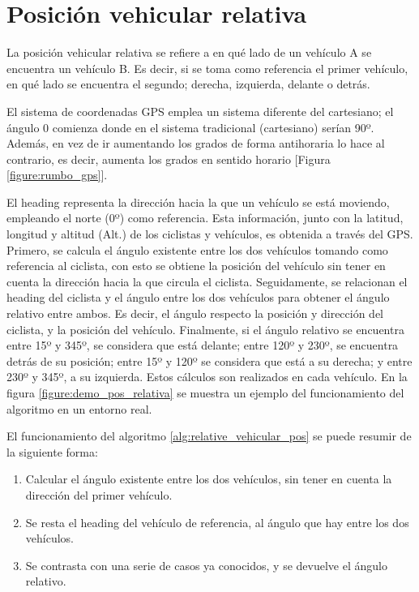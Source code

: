 \section{Posición vehicular relativa}\label{apendice:posicion_relative}
La posición vehicular relativa se refiere a en qué lado de un vehículo A se encuentra
un vehículo B. Es decir, si se toma como referencia el primer vehículo, en qué lado se
encuentra el segundo; derecha, izquierda, delante o detrás.

El sistema de coordenadas GPS emplea un sistema diferente del cartesiano; el ángulo 0
comienza donde en el sistema tradicional (cartesiano) serían 90º. Además, en vez de ir
aumentando los grados de forma antihoraria lo hace al contrario, es decir, aumenta los
grados en sentido horario [Figura \ref{figure:rumbo_gps}].

El heading representa la dirección hacia la que un vehículo se está moviendo, empleando
el norte (0º) como referencia. Esta información, junto con la latitud, longitud y
altitud (Alt.) de los ciclistas y vehículos, es obtenida a través del GPS. Primero, se
calcula el ángulo existente entre los dos vehículos tomando como referencia al ciclista,
con esto se obtiene la posición del vehículo sin tener en cuenta la dirección hacia la que
circula el ciclista. Seguidamente, se relacionan el heading del ciclista y el ángulo entre
los dos vehículos para obtener el ángulo relativo entre ambos. Es decir, el ángulo respecto
la posición y dirección del ciclista, y la posición del vehículo. Finalmente, si el ángulo
relativo se encuentra entre 15º y 345º, se considera que está delante; entre 120º y 230º,
se encuentra detrás de su posición; entre 15º y 120º se considera que está a su derecha;
y entre 230º y 345º, a su izquierda. Estos cálculos son realizados en cada vehículo. En la
figura \ref{figure:demo_pos_relativa} se muestra un ejemplo del funcionamiento del algoritmo
en un entorno real.

El funcionamiento del algoritmo \ref{alg:relative_vehicular_pos} se puede resumir de la
siguiente forma:
\begin{enumerate}
	\item Calcular el ángulo existente entre los dos vehículos, sin tener en cuenta
	la dirección del primer vehículo.
	\item Se resta el heading del vehículo de referencia, al ángulo que hay entre
	los dos vehículos.
	\item Se contrasta con una serie de casos ya conocidos, y se devuelve el ángulo
 	relativo.
\end{enumerate}

